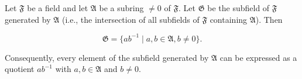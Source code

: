 Let $\mathfrak{F}$ be a field and let $\mathfrak{A}$ be a subring $\neq 0$ of $\mathfrak{F}$. Let $\mathfrak{G}$ be the subfield of $\mathfrak{F}$ generated by $\mathfrak{A}$ (i.e., the intersection of all subfields of $\mathfrak{F}$ containing $\mathfrak{A}$). Then

$$\mathfrak{G} = \{ab^{-1} \mid a, b \in \mathfrak{A}, b \neq 0\}.$$

Consequently, every element of the subfield generated by $\mathfrak{A}$ can be expressed as a quotient $ab^{-1}$ with $a, b \in \mathfrak{A}$ and $b \neq 0$.
